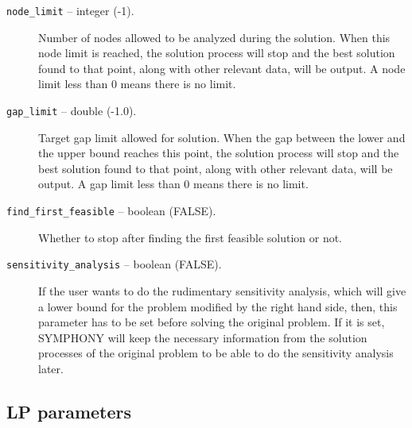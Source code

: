 \begin{description}
\item[{\tt node\_limit} -- integer (-1).]
Number of nodes allowed to be analyzed during the solution. When this
node limit is reached, the solution process will stop and the best
solution found to that point, along with other relevant data, will be
output. A node limit less than 0 means there is no limit. 

\item[{\tt gap\_limit} -- double (-1.0).]
Target gap limit allowed for solution. When the gap between the lower and 
the upper bound reaches this point, the solution process will stop and the 
best solution found to that point, along with other relevant data, will be
output. A gap limit less than 0 means there is no limit.

\item[{\tt find\_first\_feasible} -- boolean (FALSE).]
Whether to stop after finding the first feasible solution or not. 

\item[{\tt sensitivity\_analysis} -- boolean (FALSE).]
If the user wants to do the rudimentary sensitivity analysis, which will 
give a lower bound for the problem modified by the right hand side, then, 
this parameter has to be set before solving the original problem. If it 
is set, SYMPHONY will keep the necessary information from the solution 
processes of the original problem to be able to do the sensitivity analysis 
later.  

\end{description}

\subsection{LP parameters}

